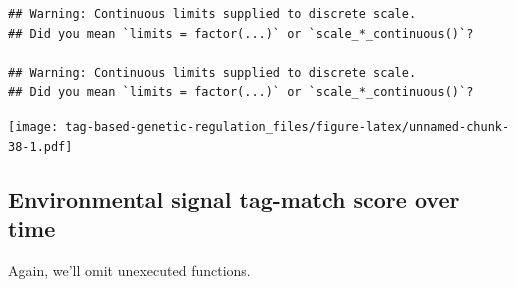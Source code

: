 \documentclass[
]{book}
\begin{document}
\begin{verbatim}
## Warning: Continuous limits supplied to discrete scale.
## Did you mean `limits = factor(...)` or `scale_*_continuous()`?

## Warning: Continuous limits supplied to discrete scale.
## Did you mean `limits = factor(...)` or `scale_*_continuous()`?
\end{verbatim}

\texttt{[image: tag-based-genetic-regulation\_files/figure-latex/unnamed-chunk-38-1.pdf]}

\hypertarget{environmental-signal-tag-match-score-over-time}{%
\subsection{Environmental signal tag-match score over time}\label{environmental-signal-tag-match-score-over-time}}

Again, we'll omit unexecuted functions.
\end{document}
